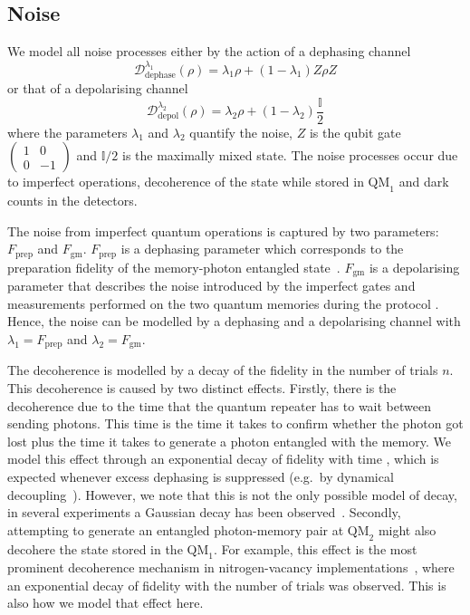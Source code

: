 \documentclass[aps,pra,reprint,superscriptaddress]{revtex4-1}
\begin{document}
\subsection*{Noise}
\label{sec:noisesection}
We model all noise processes either by the action of a dephasing channel
\begin{equation}
\mathcal D_\text{dephase}^{\lambda_1}(\rho)=\lambda_1\rho+\left(1-\lambda_1\right)Z\rho Z
\end{equation}
or that of a depolarising channel 
\begin{equation}
\mathcal D_\text{depol}^{\lambda_2}(\rho)=\lambda_2\rho+\left(1-\lambda_2\right)\frac{\mathbb{I}}{2}
\end{equation}
where the parameters $\lambda_1$ and $\lambda_2$ quantify the noise, $Z$ is the qubit gate $\left( \begin{smallmatrix} 1&0\\ 0&-1\end{smallmatrix}\right)$ and $\mathbb{I}/2$ is the maximally mixed state. The noise processes occur due to imperfect operations, decoherence of the state while stored in $\textrm{QM}_1$ and dark counts in the detectors.

The noise from imperfect quantum operations is captured by two parameters: $F_{\textrm{prep}}$ and $F_{\textrm{gm}}$. $F_{\textrm{prep}}$ is a dephasing parameter which corresponds to the preparation fidelity of the memory-photon entangled state~\cite{togan2010quantum}. $F_{\textrm{gm}}$ is a depolarising parameter that describes the noise introduced by the imperfect gates and measurements performed on the two quantum memories during the protocol \cite{cramer2015repeated, kalb2017entanglement}. Hence, the noise can be modelled by a dephasing and a depolarising channel with $\lambda_1=F_{\textrm{prep}}$ and $\lambda_2=F_{\textrm{gm}}$.

The decoherence is modelled by a decay of the fidelity in the number of trials $n$. This decoherence is caused by two distinct effects. Firstly, there is the decoherence due to the time that the quantum repeater has to wait between sending photons. This time is the time it takes to confirm whether the photon got lost plus the time it takes to generate a photon entangled with the memory. We model this effect through an exponential decay of fidelity with time \cite{nemoto2016photonic}, which is expected whenever excess dephasing is suppressed (e.g.~by dynamical decoupling~\cite{de2010universal}). However, we note that this is not the only possible model of decay, in several experiments a Gaussian decay has been observed~\cite{specht2011single, hucul2015modular,sangouard2011quantum, thiel2011rare}. Secondly, attempting to generate an entangled photon-memory pair at $\textrm{QM}_2$ might also decohere the state stored in the $\textrm{QM}_1$. For example, this effect is the most prominent decoherence mechanism in nitrogen-vacancy implementations~\cite{reiserer2016robust}, where an exponential decay of fidelity with the number of trials was observed. This is also how we model that effect here.
\end{document}
